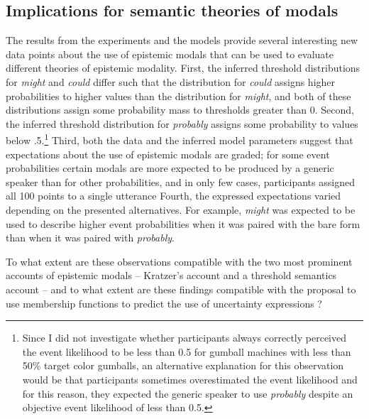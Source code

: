 \subsection{Implications for semantic theories of modals}
\label{subsec:discussion-sem-theories}

The results from the experiments and the models provide several interesting new data points about the use
of epistemic modals that can be used to evaluate different theories of epistemic modality. First, the inferred threshold 
distributions for \textit{might} and \textit{could} differ such that the distribution for \textit{could} assigns higher probabilities 
to higher values than the distribution for \textit{might}, and both of these distributions assign some probability mass to thresholds
greater than 0. Second, the inferred threshold distribution
for \textit{probably} assigns some probability to values below .5.\footnote{Since I did not investigate whether participants always correctly perceived the event likelihood to be less than 0.5 for gumball machines with less than 50\% target color gumballs, an alternative explanation for this observation would be that participants sometimes overestimated the event likelihood and for this reason, they expected the generic speaker to use \textit{probably} despite an objective event likelihood of less than 0.5.} Third, both the data
and the inferred model parameters suggest that expectations about the use of epistemic modals are graded; for some
event probabilities certain modals are more expected to be produced by a generic speaker than for other probabilities,
and in only few cases, participants assigned all 100 points to a single utterance Fourth, the expressed expectations varied 
depending on the presented alternatives. For example, \textit{might} was expected to be used to describe higher event probabilities 
when it was paired with the bare form than when it was paired with
\textit{probably}.


 To what extent are these observations compatible with the two most prominent accounts of epistemic modals -- Kratzer's \cite{Kratzer2012}
account and a threshold semantics account \cite{Lassiter2016,Swanson2006,Yalcin2010} -- and to what extent are these findings 
compatible with the proposal to use membership functions to predict the use of uncertainty expressions \cite{Wallsten1986}?

